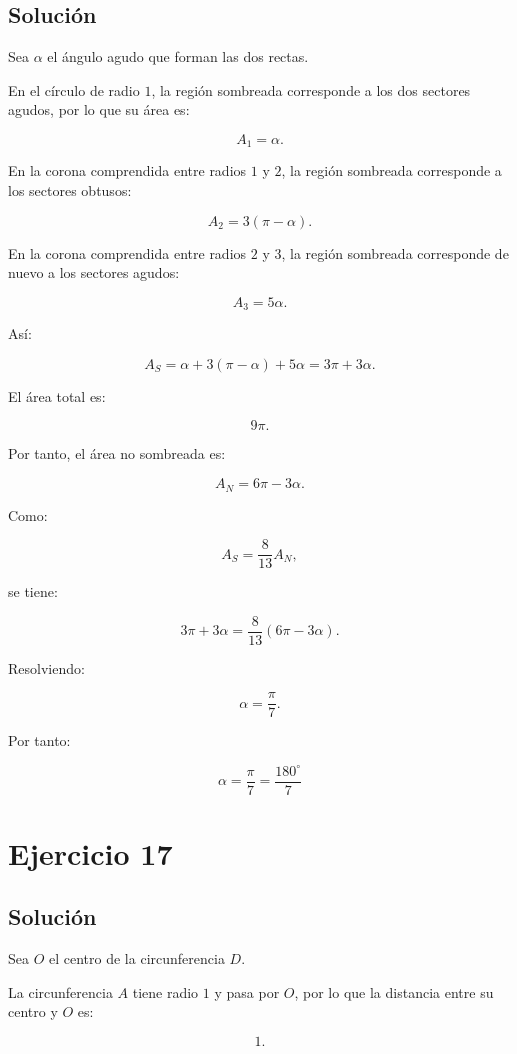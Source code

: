 \documentclass[11pt,a4paper]{article}
\begin{document}
\subsection{Solución}

Sea \(\alpha\) el ángulo agudo que forman las dos rectas.

En el círculo de radio \(1\), la región sombreada corresponde a los dos sectores agudos, por lo que su área es:

\[
A_1=\alpha.
\]

En la corona comprendida entre radios \(1\) y \(2\), la región sombreada corresponde a los sectores obtusos:

\[
A_2
=
3(\pi-\alpha).
\]

En la corona comprendida entre radios \(2\) y \(3\), la región sombreada corresponde de nuevo a los sectores agudos:

\[
A_3
=
5\alpha.
\]

Así:

\[
A_S
=
\alpha+3(\pi-\alpha)+5\alpha
=
3\pi+3\alpha.
\]

El área total es:

\[
9\pi.
\]

Por tanto, el área no sombreada es:

\[
A_N
=
6\pi-3\alpha.
\]

Como:

\[
A_S
=
\frac8{13}A_N,
\]

se tiene:

\[
3\pi+3\alpha
=
\frac8{13}
(6\pi-3\alpha).
\]

Resolviendo:

\[
\alpha=\frac{\pi}{7}.
\]

Por tanto:

\[
\boxed{
\alpha
=
\frac{\pi}{7}
=
\frac{180^\circ}{7}
}
\]

\section{Ejercicio 17}
\subsection{Solución}

Sea \(O\) el centro de la circunferencia \(D\).

La circunferencia \(A\) tiene radio \(1\) y pasa por \(O\), por lo que la distancia entre su centro y \(O\) es:

\[
1.
\]
\end{document}
